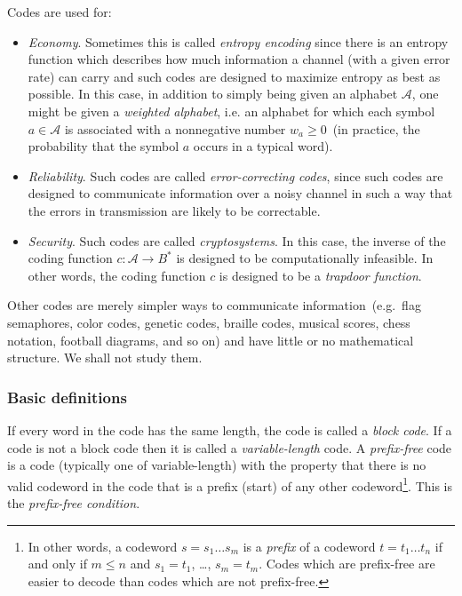 Codes are used for:
\begin{itemize}
\item \emph{Economy}. Sometimes this is called \emph{entropy encoding}
  since there is an entropy function which describes how much
  information a channel (with a given error rate) can carry and such
  codes are designed to maximize entropy as best as possible. In this
  case, in addition to simply being given an alphabet $\mathcal{A}$,
  one might be given a \emph{weighted alphabet}, i.e. an alphabet for
  which each symbol $a \in \mathcal{A}$ is associated with a
  nonnegative number $w_a \geq 0$~(in practice, the probability that
  the symbol $a$ occurs in a typical word).

\item \emph{Reliability}. Such codes are called
  \emph{error-correcting codes}, since such codes are designed to
  communicate information over a noisy channel in such a way that the
  errors in transmission are likely to be correctable.

\item \emph{Security}. Such codes are called \emph{cryptosystems}. In
  this case, the inverse of the coding function
  $c: \mathcal{A} \to B^*$ is designed to be computationally
  infeasible. In other words, the coding function $c$ is designed to
  be a \emph{trapdoor function}.
\end{itemize}
Other codes are merely simpler ways to communicate
information~(e.g.~flag semaphores, color codes, genetic codes, braille
codes, musical scores, chess notation, football diagrams, and so on)
and have little or no mathematical structure. We shall not study them.


\subsubsection{Basic definitions}

If every word in the code has the same length, the code is called
a {\it block code}. If a code is not a block code then it is called
a {\it variable-length} code.
A {\it prefix-free} code is a code (typically one of variable-length)
with the property that there is no valid codeword in the code that
is a prefix (start) of any other codeword\footnote{In other words,
a codeword $s=s_1 \dots s_m$ is a {\it prefix} of a codeword
$t=t_1\dots t_n$ if and only if $m\leq n$ and
$s_1=t_1$, \dots, $s_m=t_m$. Codes which are prefix-free are easier
to decode than codes which are not prefix-free.}.
This is the {\it prefix-free condition}.

